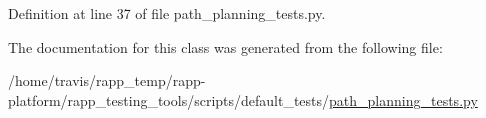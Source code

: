 Definition at line 37 of file path\-\_\-planning\-\_\-tests.\-py.



The documentation for this class was generated from the following file\-:\begin{DoxyCompactItemize}
\item 
/home/travis/rapp\-\_\-temp/rapp-\/platform/rapp\-\_\-testing\-\_\-tools/scripts/default\-\_\-tests/\hyperlink{path__planning__tests_8py}{path\-\_\-planning\-\_\-tests.\-py}\end{DoxyCompactItemize}

